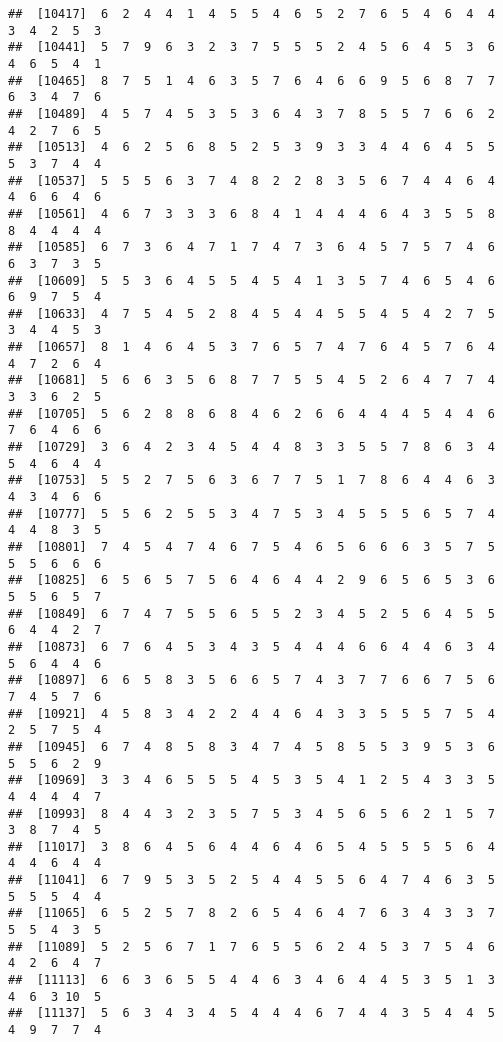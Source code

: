 \documentclass[
]{book}
\begin{document}
\begin{verbatim}
##  [10417]  6  2  4  4  1  4  5  5  4  6  5  2  7  6  5  4  6  4  4  3  4  2  5  3
##  [10441]  5  7  9  6  3  2  3  7  5  5  5  2  4  5  6  4  5  3  6  4  6  5  4  1
##  [10465]  8  7  5  1  4  6  3  5  7  6  4  6  6  9  5  6  8  7  7  6  3  4  7  6
##  [10489]  4  5  7  4  5  3  5  3  6  4  3  7  8  5  5  7  6  6  2  4  2  7  6  5
##  [10513]  4  6  2  5  6  8  5  2  5  3  9  3  3  4  4  6  4  5  5  5  3  7  4  4
##  [10537]  5  5  5  6  3  7  4  8  2  2  8  3  5  6  7  4  4  6  4  4  6  6  4  6
##  [10561]  4  6  7  3  3  3  6  8  4  1  4  4  4  6  4  3  5  5  8  8  4  4  4  4
##  [10585]  6  7  3  6  4  7  1  7  4  7  3  6  4  5  7  5  7  4  6  6  3  7  3  5
##  [10609]  5  5  3  6  4  5  5  4  5  4  1  3  5  7  4  6  5  4  6  6  9  7  5  4
##  [10633]  4  7  5  4  5  2  8  4  5  4  4  5  5  4  5  4  2  7  5  3  4  4  5  3
##  [10657]  8  1  4  6  4  5  3  7  6  5  7  4  7  6  4  5  7  6  4  4  7  2  6  4
##  [10681]  5  6  6  3  5  6  8  7  7  5  5  4  5  2  6  4  7  7  4  3  3  6  2  5
##  [10705]  5  6  2  8  8  6  8  4  6  2  6  6  4  4  4  5  4  4  6  7  6  4  6  6
##  [10729]  3  6  4  2  3  4  5  4  4  8  3  3  5  5  7  8  6  3  4  5  4  6  4  4
##  [10753]  5  5  2  7  5  6  3  6  7  7  5  1  7  8  6  4  4  6  3  4  3  4  6  6
##  [10777]  5  5  6  2  5  5  3  4  7  5  3  4  5  5  5  6  5  7  4  4  4  8  3  5
##  [10801]  7  4  5  4  7  4  6  7  5  4  6  5  6  6  6  3  5  7  5  5  5  6  6  6
##  [10825]  6  5  6  5  7  5  6  4  6  4  4  2  9  6  5  6  5  3  6  5  5  6  5  7
##  [10849]  6  7  4  7  5  5  6  5  5  2  3  4  5  2  5  6  4  5  5  6  4  4  2  7
##  [10873]  6  7  6  4  5  3  4  3  5  4  4  4  6  6  4  4  6  3  4  5  6  4  4  6
##  [10897]  6  6  5  8  3  5  6  6  5  7  4  3  7  7  6  6  7  5  6  7  4  5  7  6
##  [10921]  4  5  8  3  4  2  2  4  4  6  4  3  3  5  5  5  7  5  4  2  5  7  5  4
##  [10945]  6  7  4  8  5  8  3  4  7  4  5  8  5  5  3  9  5  3  6  5  5  6  2  9
##  [10969]  3  3  4  6  5  5  5  4  5  3  5  4  1  2  5  4  3  3  5  4  4  4  4  7
##  [10993]  8  4  4  3  2  3  5  7  5  3  4  5  6  5  6  2  1  5  7  3  8  7  4  5
##  [11017]  3  8  6  4  5  6  4  4  6  4  6  5  4  5  5  5  5  6  4  4  4  6  4  4
##  [11041]  6  7  9  5  3  5  2  5  4  4  5  5  6  4  7  4  6  3  5  5  5  5  4  4
##  [11065]  6  5  2  5  7  8  2  6  5  4  6  4  7  6  3  4  3  3  7  5  5  4  3  5
##  [11089]  5  2  5  6  7  1  7  6  5  5  6  2  4  5  3  7  5  4  6  4  2  6  4  7
##  [11113]  6  6  3  6  5  5  4  4  6  3  4  6  4  4  5  3  5  1  3  4  6  3 10  5
##  [11137]  5  6  3  4  3  4  5  4  4  4  6  7  4  4  3  5  4  4  5  4  9  7  7  4

\end{verbatim}
\end{document}
